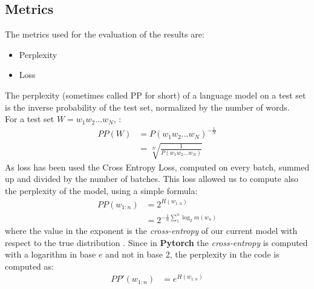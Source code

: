 \subsection{Metrics}
The metrics used for the evaluation of the results are:
\begin{itemize}
    \item Perplexity
    \item Loss
\end{itemize}
The perplexity (sometimes called PP for short) of a language model on a test set is the inverse probability of the test set, normalized by the number of words. \\
For a test set $W = w_1w_2 ...w_N$, \cite{Ngram_Language_Models}:
\begin{align*}
    PP(W) & = P(w_1w_2...w_N)^{-\frac{1}{N}} \\
         & = \sqrt[N]{\frac{1}{P(w_1w_2...w_N)}}
\end{align*}
As loss has been used the Cross Entropy Loss, computed on every batch, summed up and divided by the number of batches. This loss allowed us to compute also the perplexity of the model, using a simple formula: 
\begin{align*}
    PP(w_{1:n}) & = 2^{H(w_{1:n})} \\
         & = 2^{-\frac{1}{n}\sum_{1}^{n}\log_2{m(w_n)}}
\end{align*}
where the value in the exponent is the \textit{cross-entropy} of our current model with respect to the true distribution \cite{Ngram_Language_Models}. Since in \textbf{Pytorch} the \textit{cross-entropy} is computed with a logarithm in base $e$ and not in base 2, the perplexity in the code is computed as:
\begin{align*}
    PP'(w_{1:n}) & = e^{H(w_{1:n})}
\end{align*}

